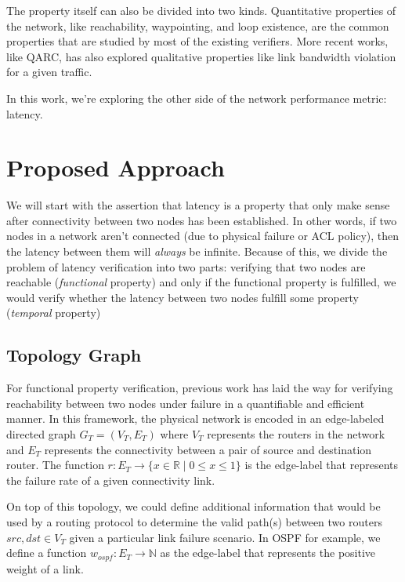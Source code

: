 \documentclass[10pt,sigconf,letterpaper,anonymous,nonacm]{acmart}
\begin{document}
The property itself can also be divided into two kinds. 
Quantitative properties of the network, like reachability, waypointing, and loop existence, are 
the common properties that are studied by most of the existing verifiers. 
More recent works, like QARC, has also explored qualitative properties like link bandwidth 
violation for a given traffic.

In this work, we're exploring the other side of the network performance metric: latency. 

\section{Proposed Approach}
We will start with the assertion that latency is a property that only make sense 
after connectivity between two nodes has been established. 
In other words, if two nodes in a network aren't connected (due to physical failure 
or ACL policy), then the latency between them will \textit{always} be infinite.
Because of this, we divide the problem of latency verification into two parts: 
verifying that two nodes are reachable (\textit{functional} property) and only if 
the functional property is fulfilled, we would verify whether the latency between 
two nodes fulfill some property (\textit{temporal} property)

\subsection{Topology Graph}
For functional property verification, previous work \cite{steffen2020probabilistic} 
has laid the way for verifying reachability between two nodes under failure in a 
quantifiable and efficient manner. 
In this framework, the physical network is encoded in an edge-labeled directed graph 
$G_T = (V_T, E_T)$ where $V_T$ represents the routers in the network and 
$E_T$ represents the connectivity between a pair of source and destination router. 
The function $r: E_T \rightarrow \{x \in \mathbb{R} \mid 0 \le x \le 1\}$ is the 
edge-label that represents the failure rate of a given connectivity link.

On top of this topology, we could define additional information that would be used
by a routing protocol to determine the valid path(s) between two routers 
$src, dst \in V_T$ given a particular link failure scenario. In OSPF for example, 
we define a function $w_{ospf}: E_T \rightarrow \mathbb{N}$ as the edge-label that 
represents the positive weight of a link.
\end{document}
